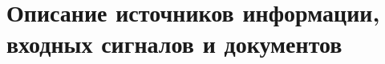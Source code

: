 \documentclass[../nirs.tex]{subfiles}
\begin{document}
\section{Описание источников информации, входных сигналов и документов}
\end{document}
